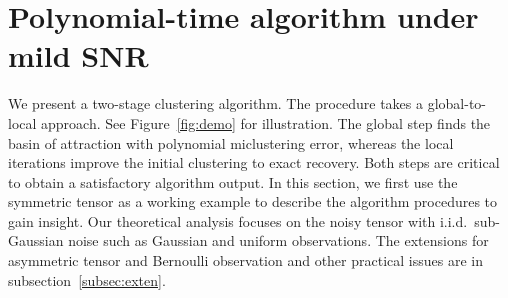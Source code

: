 \documentclass[lettersize,onecolumn,journal]{IEEEtran}
\theoremstyle{definition}
\theoremstyle{definition}
\begin{document}





\section{Polynomial-time algorithm under mild SNR}\label{sec:alg}
We present a two-stage clustering algorithm. The procedure takes a global-to-local approach. See Figure~\ref{fig:demo} for illustration. The global step finds the basin of attraction with polynomial miclustering error, whereas the local iterations improve the initial clustering to exact recovery. Both steps are critical to obtain a satisfactory algorithm output.{\color{blue} In this section, we first use the symmetric tensor as a working example to describe the algorithm procedures to gain insight. Our theoretical analysis focuses on the noisy tensor with i.i.d.\ sub-Gaussian noise such as Gaussian and uniform observations. The extensions for asymmetric tensor and Bernoulli observation and other practical issues are in subsection~\ref{subsec:exten}.}
\end{document}
